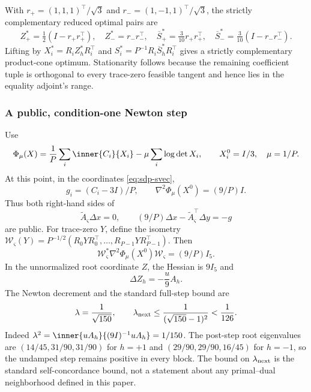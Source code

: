 With $r_+=(1,1,1)^\top/\sqrt3$ and $r_-=(1,-1,1)^\top/\sqrt3$, the strictly
complementary reduced optimal pairs are
\begin{equation}
 Z_+^*=\tfrac12(I-r_+r_+^\top),\quad Z_-^*=r_-r_-^\top,
 \quad \overline S_+^*=\tfrac3{10}r_+r_+^\top,
 \quad \overline S_-^*=\tfrac3{10}(I-r_-r_-^\top).            \label{eq:sdp-strict-complementarity}
\end{equation}
Lifting by $X_i^*=R_iZ_h^*R_i^\top$ and
$S_i^*=P^{-1}R_i\overline S_h^*R_i^\top$ gives a strictly complementary
product-cone optimum.  Stationarity follows because the remaining
coefficient tuple is orthogonal to every trace-zero feasible tangent and
hence lies in the equality adjoint's range.

\subsubsection{A public, condition-one Newton step}
\label{sec:sdp-intrinsic-newton}

Use
\begin{equation}
 \Phi_\mu(X)=\frac1P\sum_i\inner{C_i}{X_i}
              -\mu\sum_i\log\det X_i,\qquad
 X_i^0=I/3,\quad\mu=1/P.                                  \label{eq:sdp-public-start}
\end{equation}
At this point, in the coordinates \eqref{eq:sdp-svec},
\begin{equation}
 g_i=(C_i-3I)/P,\qquad \nabla^2\Phi_\mu(X^0)=(9/P)I.       \label{eq:sdp-public-hessian}
\end{equation}
Thus both right-hand sides of
\begin{equation}
 \widetilde A_\varsigma\Delta x=0,\qquad
 (9/P)\Delta x-\widetilde A_\varsigma^\top\Delta y=-g       \label{eq:sdp-kkt}
\end{equation}
are public.  For trace-zero $Y$, define the isometry
$\mathcal W_\varsigma(Y)=P^{-1/2}(R_0YR_0^\top,\ldots,R_{P-1}YR_{P-1}^\top)$.
Then
\begin{equation}
 \mathcal W_\varsigma^*\nabla^2\Phi_\mu(X^0)
 \mathcal W_\varsigma=(9/P)I_5.                            \label{eq:sdp-reduced-nine}
\end{equation}
In the unnormalized root coordinate $Z$, the Hessian is $9I_5$ and
\begin{equation}
 \Delta Z_h=-\frac u9A_h.                                  \label{eq:sdp-root-direction}
\end{equation}
The Newton decrement and the standard full-step bound are
\begin{equation}
 \lambda=\frac1{\sqrt{150}},\qquad
 \lambda_{\rm next}\leq\frac1{(\sqrt{150}-1)^2}<\frac1{126}.
 \label{eq:sdp-decrement}
\end{equation}
Indeed $\lambda^2=\inner{uA_h}{(9I)^{-1}uA_h}=1/150$.
The post-step root eigenvalues are $(14/45,31/90,31/90)$ for $h=+1$ and
$(29/90,29/90,16/45)$ for $h=-1$, so the undamped step remains positive in
every block.  The bound on $\lambda_{\rm next}$ is the standard
self-concordance bound, not a statement about any primal--dual neighborhood
defined in this paper.

